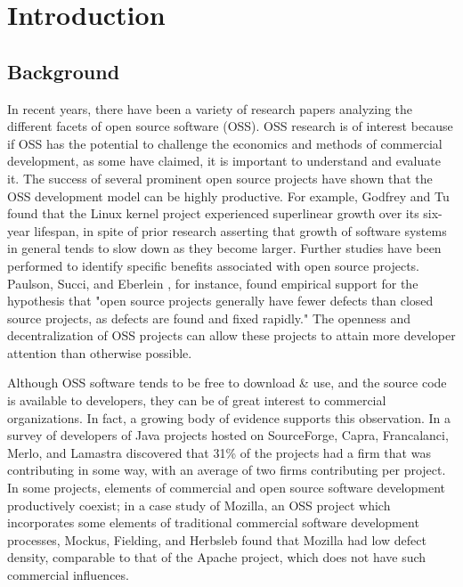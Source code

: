 \chapter{Introduction}
\section{Background}
In recent years, there have been a variety of research papers analyzing the different facets of open source software (OSS). OSS research is of interest because if OSS has the potential to challenge the economics and methods of commercial development, 
as some have claimed, it is important to understand and evaluate it\cite{mockus2002two}. The success of several prominent open source projects have shown that the OSS development model can be highly productive. For example, Godfrey and Tu \cite{godfrey2000evolution} found that the Linux kernel project experienced superlinear growth over its six-year lifespan, in spite of prior research asserting that growth of software systems in general tends to slow down as they become larger. Further studies have been performed to identify specific benefits associated with open source projects. Paulson, Succi, and Eberlein \cite{paulson2004empirical}, for instance, found empirical support for the hypothesis that "open source projects generally have fewer defects than closed source projects, as defects are found and fixed rapidly." The openness and decentralization of OSS projects can allow these projects to attain more developer attention than otherwise possible.

Although OSS software tends to be free to download \& use, and the source code
is available to developers, 
 they can be of great interest to
 commercial organizations. In fact, a growing body of evidence supports this observation. %
  In a survey of developers of Java projects hosted on SourceForge, Capra, Francalanci, Merlo, and Lamastra discovered that 31\% of the projects had a firm that was contributing in some way, with an average of two firms contributing per project\cite{capra2009survey}. In some projects, elements of commercial and open source software development productively coexist; in a case study of Mozilla, an OSS project which incorporates some elements of traditional commercial software development processes, Mockus, Fielding, and Herbsleb \cite{mockus2002two} found that Mozilla had low defect density, comparable to that of the Apache project, which does not have such commercial influences.

